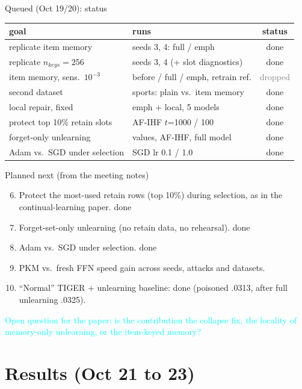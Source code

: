 \documentclass{beamer}
\newcommand{\pierre}[1]{\textcolor{cyan}{#1}}
\newcommand{\stdone}{\textcolor{green!50!black}{done}}
\newcommand{\stdrop}{\textcolor{gray}{dropped}}
\begin{document}
\begin{frame}{Queued (Oct 19/20): status}
\begin{center}
\footnotesize\setlength{\tabcolsep}{4pt}
\begin{tabular}{|l|l|c|}
\hline
goal & runs & status \\
\hline
replicate item memory & seeds 3, 4: full / emph & \stdone \\
replicate $n_{keys}=256$ & seeds 3, 4 (+ slot diagnostics) & \stdone \\
item memory, sens.\ $10^{-3}$ & before / full / emph, retrain ref. & \stdrop \\
second dataset & sports: plain vs.\ item memory & \stdone \\
local repair, fixed & emph + local, 5 models & \stdone \\
protect top 10\% retain slots & AF-IHF $t$=1000 / 100 & \stdone \\
forget-only unlearning & values, AF-IHF, full model & \stdone \\
Adam vs.\ SGD under selection & SGD lr 0.1 / 1.0 & \stdone \\
\hline
\end{tabular}
\end{center}
\end{frame}

\begin{frame}{Planned next (from the meeting notes)}
\begin{enumerate}
  \setcounter{enumi}{5}
  \item Protect the most-used retain rows (top 10\%) during selection, as in the
        continual-learning paper. \stdone
  \item Forget-set-only unlearning (no retain data, no rehearsal). \stdone
  \item Adam vs.\ SGD under selection. \stdone
  \item PKM vs.\ fresh FFN speed gain across seeds, attacks and datasets.
  \item ``Normal'' TIGER $+$ unlearning baseline: \stdone{} (poisoned .0313, after full unlearning .0325).
\end{enumerate}

\medskip
\pierre{Open question for the paper: is the contribution the collapse fix, the
locality of memory-only unlearning, or the item-keyed memory?}
\end{frame}

\section{Results (Oct 21 to 23)}
\end{document}
